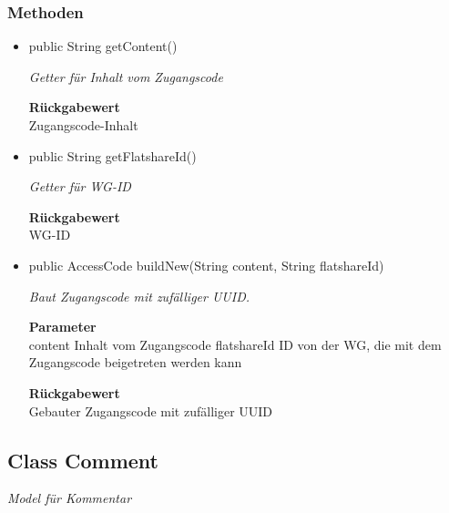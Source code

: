 \documentclass[a4paper]{scrreprt}
\begin{document}
        \subsubsection{Methoden}
        \begin{itemize}
        	\item{public String getContent()}
        	
        	\textit{Getter für Inhalt vom Zugangscode}
        	
        	
        	
        	\textbf{Rückgabewert} \\
        	Zugangscode-Inhalt        \item{public String getFlatshareId()}
        	
        	\textit{Getter für WG-ID}
        	
        	
        	
        	\textbf{Rückgabewert} \\
        	WG-ID        \item{public AccessCode buildNew(String content, String flatshareId)}
        	
        	\textit{Baut Zugangscode mit zufälliger UUID.}
        	
        	\textbf{Parameter} \\
        	content Inhalt vom Zugangscode
        	flatshareId ID von der WG, die mit dem Zugangscode beigetreten werden kann
        	
        	\textbf{Rückgabewert} \\
        	Gebauter Zugangscode mit zufälliger UUID
        \end{itemize}
        \subsection{Class Comment}
        \textit{Model für Kommentar}
\end{document}
